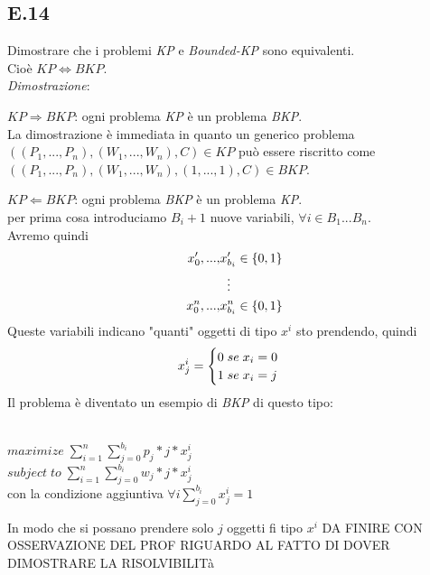 \documentclass[a4paper]{article}
\newenvironment{dimostrazione}{\textit{Dimostrazione}:\begin{adjustwidth}{1cm}{}}{\end{adjustwidth}}
\begin{document}
\subsection{E.14}
Dimostrare che i problemi \emph{KP} e \emph{Bounded-KP} sono equivalenti.\\Cioè $KP \Leftrightarrow BKP$.\\
\begin{dimostrazione}
	$KP \Rightarrow BKP$: ogni problema \emph{KP} è un problema \emph{BKP}.\\
	La dimostrazione è immediata in quanto un generico problema\\$((P_1, ... ,P_n),(W_1, ... ,W_n),C)\in KP$ può essere riscritto come\\ $((P_1, ... ,P_n),(W_1, ... ,W_n),(1, ... ,1),C) \in BKP$.

	$KP \Leftarrow BKP$: ogni problema \emph{BKP} è un problema \emph{KP}.\\
	per prima cosa introduciamo $B_i + 1$ nuove variabili, $\forall i \in B_1 ... B_n$.\\
	Avremo quindi
	\begin{align}
		x_{0}', ... ,&x_{b_i}' \in \{0,1\}  \notag \\
   		&\;\;\vdots \notag \\
		x_{0}^n, ... ,&x_{b_i}^n \in \{0,1\}  \notag 
	\end{align}
	Queste variabili indicano "quanti" oggetti di tipo $x^i$ sto prendendo, quindi 
	\begin{equation}
		x_{j}^i=\begin{cases}
      		0\; se\; x_i = 0\\
      		1\; se\; x_i = j \notag
    		\end{cases}
	\end{equation}
	Il problema è diventato un esempio di \emph{BKP} di questo tipo:
	\begin{center}
		\\
		$maximize \; \sum_{i=1}^{n} \sum_{j=0}^{b_i} p_j*j*x^i_j$\\
		$subject \; to \; \sum_{i=1}^{n} \sum_{j=0}^{b_i} w_j*j*x^i_j$\\
		con la condizione aggiuntiva $ \forall i \sum_{j=0}^{b_i} x_j^i = 1$
	\end{center}
	In modo che  si possano prendere solo $j$ oggetti fi tipo $x^i$
	DA FINIRE CON OSSERVAZIONE DEL PROF RIGUARDO AL FATTO DI DOVER DIMOSTRARE LA RISOLVIBILITà
\end{dimostrazione}
\end{document}
